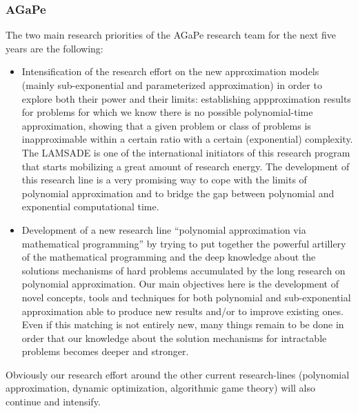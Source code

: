 \subsubsection{AGaPe}
The two main research priorities of the AGaPe research team for the next five years are the following:
\begin{itemize}
\item Intensification of the research effort on the new approximation models (mainly sub-exponential and parameterized approximation) in order to explore both their power and their limits: establishing appproximation results for problems for which we know there is no possible polynomial-time approximation, showing that 
a given problem or class of problems is inapproximable within a certain ratio with a certain (exponential) complexity. The LAMSADE is one of the international initiators of this research program that starts mobilizing a great amount of research energy. The development of this research line is a very promising way to cope with the limits of polynomial approximation and to bridge the gap between polynomial and exponential computational time.
\item Development of a new research line “polynomial approximation via mathematical programming” by trying to put together the powerful artillery of the mathematical programming and the deep knowledge about the solutions mechanisms of hard problems accumulated by the long research on polynomial approximation. Our main objectives here is the development of novel concepts, tools and techniques for both polynomial and sub-exponential approximation able to produce new results and/or to improve existing ones. Even if this matching is not entirely new, many things remain to be done in order that our knowledge about the solution mechanisms for intractable problems becomes deeper and stronger.
\end{itemize}
Obviously our research effort around the other current research-lines (polynomial approximation, dynamic optimization, algorithmic game theory) will also continue and intensify.\\

